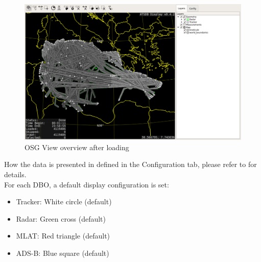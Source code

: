 \begin{figure}[H]
    \hspace*{-2cm}
    \includegraphics[width=18cm,frame]{../screenshots/osgview_overview_loaded.png}
  \caption{OSG View overview after loading}
\end{figure} 

How the data is presented in defined in the Configuration tab, please refer to  for details. \\

For each DBO, a default display configuration is set:

\begin{itemize}
 \item Tracker: White circle (default)
 \item Radar: Green cross (default)
 \item MLAT: Red triangle (default)
 \item ADS-B: Blue square (default)
\end{itemize}

